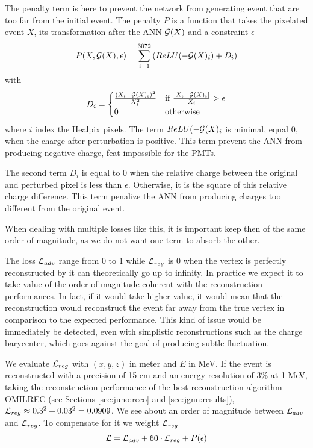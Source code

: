 \documentclass[../main.tex]{subfiles}
\begin{document}
The penalty term is here to prevent the network from generating event that are too far from the initial event. The penalty $P$ is a function that takes the pixelated event $X$, its transformation after the ANN ${\cal G}(X)$ and a constraint $\epsilon$
\begin{equation}
  P(X, {\cal G}(X), \epsilon) = \sum_{i=1}^{3072} \left( ReLU(-{\cal G}(X)_i) + D_i \right)
\end{equation}
with
\begin{equation}
  D_i = \begin{cases}
    \frac{(X_i - {\cal G}(X)_i)^2}{X_i^2}& \text{if } \frac{|X_i - {\cal G}(X)_i|}{X_i} > \epsilon \\
    0& \text{otherwise}
  \end{cases}
\end{equation}
where $i$ index the Healpix pixels. The term $ReLU(-{\cal G}(X)_i$ is minimal, equal 0, when the charge after perturbation is positive. This term prevent the ANN from producing negative charge, feat impossible for the PMTs.

The second term $D_i$ is equal to 0 when the relative charge between the original and perturbed pixel is less than $\epsilon$. Otherwise, it is the square of this relative charge difference. This term penalize the ANN from producing charges too different from the original event.
\hfill

When dealing with multiple losses like this, it is important keep then of the same order of magnitude, as we do not want one term to absorb the other.

The loss ${\cal L}_{adv}$ range from 0 to 1 while ${\cal L}_{reg}$ is 0 when the vertex is perfectly reconstructed by it can theoretically go up to infinity. In practice we expect it to take value of the order of magnitude coherent with the reconstruction performances. In fact, if it would take higher value, it would mean that the reconstruction would reconstruct the event far away from the true vertex in comparison to the expected performance. This kind of issue would be immediately be detected, even with simplistic reconstructions such as the charge barycenter, which goes against the goal of producing subtle fluctuation.

We evaluate ${\cal L}_{reg}$ with $(x, y, z)$ in meter and $E$ in MeV. If the event is reconstructed with a precision of 15 cm and an energy resolution of 3\% at 1 MeV, taking the reconstruction performance of the best reconstruction algorithm OMILREC (see Sections \ref{sec:juno:reco} and \ref{sec:jgnn:results}), ${\cal L}_{reg} \approx 0.3^2 + 0.03^2 = 0.0909$. We see about an order of magnitude between ${\cal L}_{adv}$ and ${\cal L}_{reg}$. To compensate for it we weight ${\cal L}_{reg}$
\begin{equation}
  {\cal L} = {\cal L}_{adv} + 60\cdot{\cal L}_{reg} + P(\epsilon)
\end{equation}
\end{document}
